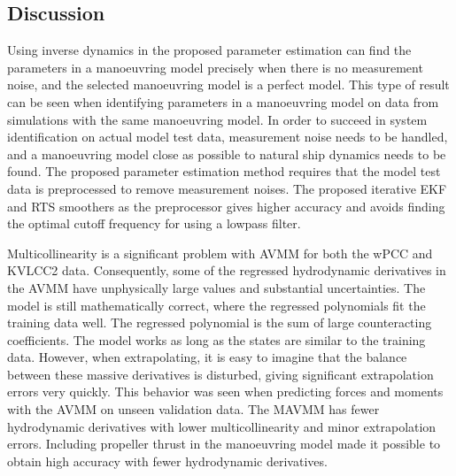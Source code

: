 \documentclass[review]{elsarticle}
\begin{document}
\subsection{Discussion}
\label{\detokenize{06.50_results_discussion:discussion}}\label{\detokenize{06.50_results_discussion::doc}}
\sphinxAtStartPar
Using inverse dynamics in the proposed parameter estimation can find the parameters in a manoeuvring model precisely when there is no measurement noise, and the selected manoeuvring model is a perfect model. This type of result can be seen when identifying parameters in a manoeuvring model on data from simulations with the same manoeuvring model. In order to succeed in system identification on actual model test data, measurement noise needs to be handled, and a manoeuvring model close as possible to natural ship dynamics needs to be found. The proposed parameter estimation method requires that the model test data is preprocessed to remove measurement noises. The proposed iterative EKF and RTS smoothers as the preprocessor gives higher accuracy and avoids finding the optimal cut\sphinxhyphen{}off frequency for using a low\sphinxhyphen{}pass filter.

\sphinxAtStartPar
Multicollinearity is a significant problem with AVMM for both the wPCC and KVLCC2 data. Consequently, some of the regressed hydrodynamic derivatives in the AVMM have unphysically large values and substantial uncertainties. The model is still mathematically correct, where the regressed polynomials fit the training data well.
The regressed polynomial is the sum of large counteracting coefficients. The model works as long as the states are similar to the training data. However, when extrapolating, it is easy to imagine that the balance between these massive derivatives is disturbed, giving significant extrapolation errors very quickly. This behavior was seen when predicting forces and moments with the AVMM on unseen validation data.
The MAVMM has fewer hydrodynamic derivatives with lower multicollinearity and minor extrapolation errors. Including propeller thrust in the manoeuvring model made it possible to obtain high accuracy with fewer hydrodynamic derivatives.
\end{document}
